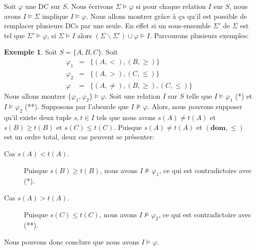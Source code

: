 \documentclass[letterpaper, 12pt]{report}
\theoremstyle{definition}
\newtheorem{myexample}{Exemple}
\newcommand{\dom}{\mathbf{dom}}
\begin{document}
Soit $\varphi$ une DC sur $S$. Nous écrivons $\Sigma \models \varphi$ si pour chaque relation $I$ sur $S$, nous avons $I \models \Sigma$ implique $I \models \varphi$. Nous allons montrer grâce à ça qu'il est possible de remplacer plusieurs DCs par une seule. En effet si un sous-ensemble $\Sigma'$ de $\Sigma$ est tel que $\Sigma' \models \varphi$, si $\Sigma \models I$ alors $(\Sigma \backslash \Sigma') \cup \varphi \models I$. Parcourons plusieurs exemples:
\begin{myexample}
\label{firstEx}
Soit $S=\{A,B,C\}$.
Soit
\begin{eqnarray*}
\varphi_{1} & = & \{(A,<), (B,\geq)\}\\
\varphi_{2} & = & \{(A,>), (C,\leq)\}\\
\varphi & = & \{(A,\neq), (B,\geq), (C,\leq)\}
\end{eqnarray*}
Nous allons montrer $\{\varphi_{1},\varphi_{2}\}\models\varphi$.
Soit une relation $I$ sur $S$ telle que $I\models\varphi_{1}$ (*) et $I\models\varphi_{2}$ (**).
Supposons par l'absurde que $I\not\models\varphi$.
Alors, nous pouvons supposer qu'il existe deux tuple $s,t\in I$ tels que nous avons
$s(A)\neq t(A)$ et $s(B)\geq t(B)$ et $s(C)\leq t(C)$.
Puisque $s(A)\neq t(A)$ et $(\dom,\leq)$ est un ordre total,
deux cas peuvent se présenter:
\begin{description}
\item[Cas $s(A)<t(A)$.]
Puisque $s(B)\geq t(B)$, nous avons $I\not\models\varphi_{1}$, ce qui est contradictoire avec (*).
\item[Cas $s(A)>t(A)$.]
Puisque $s(C)\leq t(C)$, nous avons $I\not\models\varphi_{2}$, ce qui est contradictoire avec (**).
\end{description}
Nous pouvons donc conclure que nous avons $I\models\varphi$.
\end{myexample}
\end{document}
